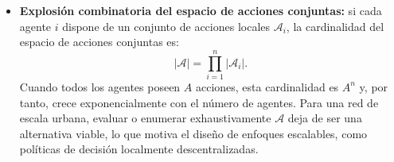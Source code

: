 \begin{itemize}
    \item \textbf{Explosión combinatoria del espacio de acciones conjuntas:} si cada agente $i$ dispone de un conjunto de acciones locales $\mathcal{A}_i$, la cardinalidad del espacio de acciones conjuntas es:
    \begin{equation}
        \left|\boldsymbol{\mathcal{A}}\right| = \prod_{i=1}^{n} \left|\mathcal{A}_i\right|.
        \label{eq:espacio_acciones_conjunto}
    \end{equation}
    Cuando todos los agentes poseen $A$ acciones, esta cardinalidad es $A^n$ y, por tanto, crece exponencialmente con el número de agentes. Para una red de escala urbana, evaluar o enumerar exhaustivamente $\boldsymbol{\mathcal{A}}$ deja de ser una alternativa viable, lo que motiva el diseño de enfoques escalables, como políticas de decisión localmente descentralizadas.


\end{itemize}
